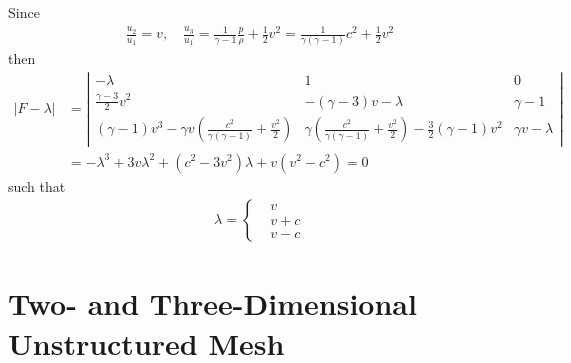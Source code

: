 \documentclass{turgon}
\begin{document}
Since
\begin{align*}
  \frac{u_2}{u_1} = v, \quad
  \frac{u_3}{u_1} = \frac{1}{\gamma-1}\frac{p}{\rho} + \frac{1}{2}v^2
    = \frac{1}{\gamma(\gamma-1)}c^2 + \frac{1}{2}v^2
\end{align*}
then
\begin{align*}
  |F-\lambda| &=
    \left|\begin{array}{ccc}
      -\lambda & 1 & 0 \\
      \frac{\gamma-3}{2}v^2 &
      -(\gamma-3)v - \lambda &
      \gamma-1 \\
      (\gamma-1)v^3
        - \gamma v(\frac{c^2}{\gamma(\gamma-1)}+\frac{v^2}{2}) &
      \gamma(\frac{c^2}{\gamma(\gamma-1)}+\frac{v^2}{2})
        - \frac{3}{2}(\gamma-1)v^2 &
      \gamma v - \lambda
    \end{array}\right| \\
  &= -\lambda^3 + 3v\lambda^2 + (c^2-3v^2)\lambda + v(v^2-c^2)
   = 0
\end{align*}
such that
\begin{align}
  \lambda = \left\{\begin{aligned}
    &v   \\
    &v+c \\
    &v-c
  \end{aligned}\right.
  \label{e:euler_eigenvalue}
\end{align}

\chapter{Two- and Three-Dimensional Unstructured Mesh}
\label{c:ustmesh}

\clearpage
{}


\end{document}
